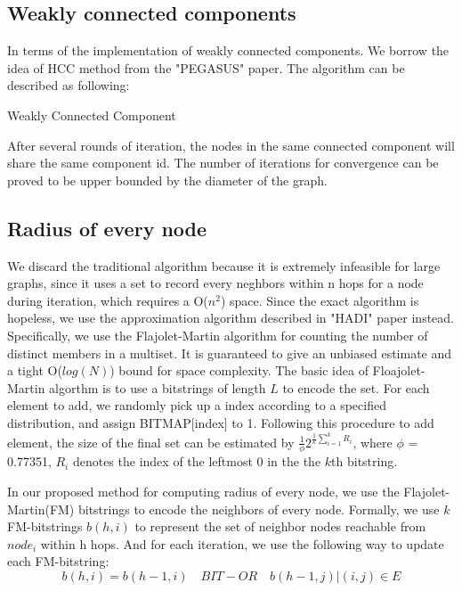 \subsection{Weakly connected components}
In terms of the implementation of weakly connected components. We borrow the idea of HCC method from the "PEGASUS" paper.\cite{Kang09}
The algorithm can be described as following:
\begin{algorithm}
\caption{Weakly Connected Component}
\begin{algorithmic}
\REPEAT
{}
\end{algorithmic}
\end{algorithm}
After several rounds of iteration, the nodes in the same connected component will share the same component id.
The number of iterations for convergence can be proved to be upper bounded by the diameter of the graph.

\subsection{Radius of every node}
We discard the traditional algorithm because it is extremely infeasible for large graphs, since it uses a set to record every neghbors within n hops for a node during iteration, which requires a O($n^2$) space.
Since the exact algorithm is hopeless, we use the approximation algorithm described in "HADI" paper\cite{DBLP:journals/tkdd/KangTAFL11} instead. Specifically, we use the Flajolet-Martin algorithm for counting the number of distinct members in a multiset. It is guaranteed to give an unbiased estimate and a tight O($log(N)$) bound for space complexity. The basic idea of Floajolet-Martin algorthm is to use a bitstrings of length $L$ to encode the set. For each element to add, we randomly pick up a index according to a specified distribution, and assign BITMAP[index] to 1. Following this procedure to add element, the size of the final set can be estimated by $\frac{1}{\phi} 2^{\frac{1}{k}\sum_{i=1}^k R_i}$, where $\phi$ = 0.77351, $R_i$ denotes the index of the leftmost 0 in the the $k$th bitstring.

In our proposed method for computing radius of every node, we use the Flajolet-Martin(FM) bitstrings to encode the neighbors of every node. Formally, we use $k$ FM-bitstrings $b(h, i)$ to represent the set of neighbor nodes reachable from $node_i$ within h hops. And for each iteration, we use the following way to update each FM-bitstring:$$b(h,i) = b(h-1,i)  \quad BIT-OR \quad  {b(h-1,j)|(i,j)\in E}$$

